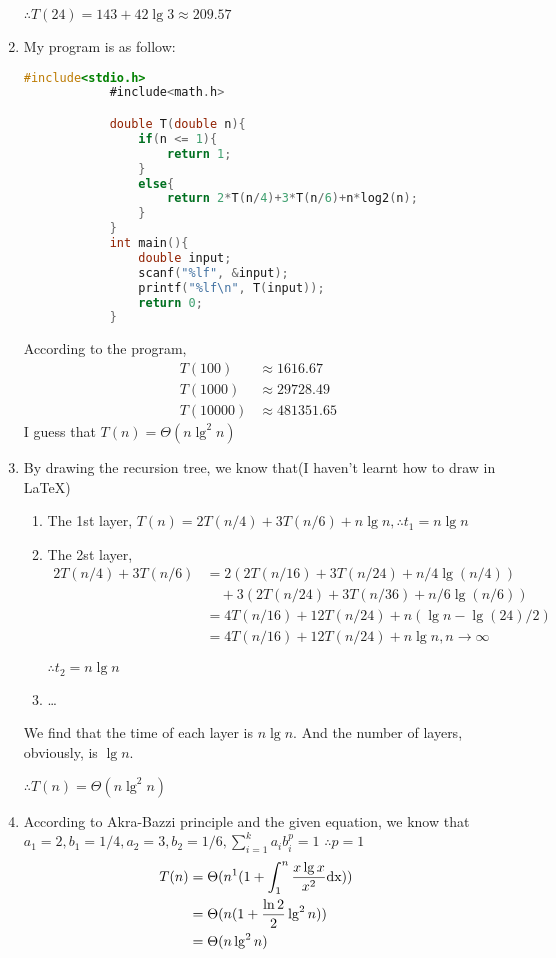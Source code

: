 \documentclass{article}
\begin{document}
\begin{sloppypar}
\begin{enumerate}
    $\therefore T(24) = 143 + 42\lg 3 \approx 209.57$

    \item My program is as follow:
        \begin{lstlisting}[language=C]
            #include<stdio.h>
            #include<math.h>

            double T(double n){
                if(n <= 1){
                    return 1;
                }
                else{
                    return 2*T(n/4)+3*T(n/6)+n*log2(n);
                }
            }
            int main(){
                double input;
                scanf("%lf", &input);
                printf("%lf\n", T(input));
                return 0;
            }
        \end{lstlisting}
    According to the program,
    \begin{align*}
        T(100) &\approx 1616.67\\
        T(1000) &\approx 29728.49\\
        T(10000) &\approx 481351.65&
    \end{align*}
    I guess that $T(n) = \Theta(n\lg^2n)$
    \item By drawing the recursion tree, we know that(I haven't learnt how to draw in LaTeX)
        \begin{enumerate}
            \item The 1st layer, $T(n) = 2T(n/4) + 3T(n/6) + n\lg n, \therefore t_1 = n\lg n$
            \item The 2st layer,
                \begin{align*}
                    2T(n/4) + 3T(n/6) &= 2(2T(n/16) + 3T(n/24) + n/4\lg(n/4))\\
                        &\quad +3(2T(n/24)+3T(n/36)+n/6\lg(n/6)) \\
                        &= 4T(n/16) + 12T(n/24) + n(\lg n - \lg(24)/2)\\
                        &= 4T(n/16) + 12T(n/24) + n\lg n, n \to \infty
                \end{align*}

                $\therefore t_2 = n\lg n$
            \item \ldots
        \end{enumerate}
        We find that the time of each layer is $n\lg n$. And the number of layers, obviously, is $\lg n$.

        $\therefore T(n) = \Theta(n\lg^2n)$
    \item According to Akra-Bazzi principle and the given equation, we know that
        $a_1 = 2, b_1 = 1/4, a_2 = 3, b_2 = 1/6, \sum_{i = 1}^{k} a_ib_i^p = 1$
        $\therefore p = 1$
        \begin{align*}
            T(n) &= \Theta(n^1(1+\int_{1}^{n}\frac{x\lg x}{x^2} \rm dx))\\
                 &= \Theta(n(1+\frac{\ln 2}{2}\lg^2n))\\
                 &= \Theta(n\lg^2n)&
        \end{align*}
\end{enumerate}


\end{sloppypar}
\end{document}
